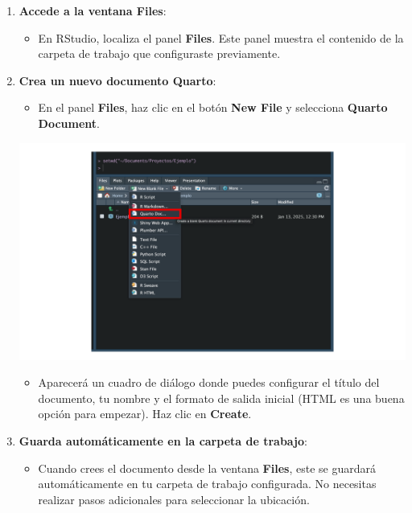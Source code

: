 \documentclass[
  letterpaper,
  DIV=11,
  numbers=noendperiod,
  twoside]{scrreprt}
\providecommand{\tightlist}{%
  \setlength{\itemsep}{0pt}\setlength{\parskip}{0pt}}\usepackage{longtable,booktabs,array}
\begin{document}
\begin{enumerate}
\def\labelenumi{\arabic{enumi}.}
\item
  \textbf{Accede a la ventana Files}:

  \begin{itemize}
  \tightlist
  \item
    En RStudio, localiza el panel \textbf{Files}. Este panel muestra el
    contenido de la carpeta de trabajo que configuraste previamente.
  \end{itemize}
\item
  \textbf{Crea un nuevo documento Quarto}:

  \begin{itemize}
  \tightlist
  \item
    En el panel \textbf{Files}, haz clic en el botón \textbf{New File} y
    selecciona \textbf{Quarto Document}.
  \end{itemize}

  \includegraphics[width=6.72917in,height=\textheight]{images/9.png}

  \begin{itemize}
  \tightlist
  \item
    Aparecerá un cuadro de diálogo donde puedes configurar el título del
    documento, tu nombre y el formato de salida inicial (HTML es una
    buena opción para empezar). Haz clic en \textbf{Create}.
  \end{itemize}
\item
  \textbf{Guarda automáticamente en la carpeta de trabajo}:

  \begin{itemize}
  \tightlist
  \item
    Cuando crees el documento desde la ventana \textbf{Files}, este se
    guardará automáticamente en tu carpeta de trabajo configurada. No
    necesitas realizar pasos adicionales para seleccionar la ubicación.
  \end{itemize}
\end{enumerate}
\end{document}
